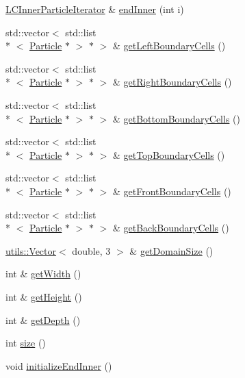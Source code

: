 \begin{DoxyCompactItemize}
\item 
\hyperlink{classutils_1_1LCInnerParticleIterator}{L\-C\-Inner\-Particle\-Iterator} \& \hyperlink{classutils_1_1LCParticleContainer_a52b237920b3ba34ca9440dc65f7f0b8e}{end\-Inner} (int i)
\item 
std\-::vector$<$ std\-::list\\*
$<$ \hyperlink{classParticle}{Particle} $\ast$ $>$ $\ast$ $>$ \& \hyperlink{classutils_1_1LCParticleContainer_aaccfac2aa0fe6a72bd323f28b9cf6c8e}{get\-Left\-Boundary\-Cells} ()
\item 
std\-::vector$<$ std\-::list\\*
$<$ \hyperlink{classParticle}{Particle} $\ast$ $>$ $\ast$ $>$ \& \hyperlink{classutils_1_1LCParticleContainer_af43e89aff6045632b40382cc43fe8707}{get\-Right\-Boundary\-Cells} ()
\item 
std\-::vector$<$ std\-::list\\*
$<$ \hyperlink{classParticle}{Particle} $\ast$ $>$ $\ast$ $>$ \& \hyperlink{classutils_1_1LCParticleContainer_a6168dbdbcb34d8a1d5c8076ab689dc68}{get\-Bottom\-Boundary\-Cells} ()
\item 
std\-::vector$<$ std\-::list\\*
$<$ \hyperlink{classParticle}{Particle} $\ast$ $>$ $\ast$ $>$ \& \hyperlink{classutils_1_1LCParticleContainer_acd0f8fa70852ca80b880cf8b2dac8a0a}{get\-Top\-Boundary\-Cells} ()
\item 
std\-::vector$<$ std\-::list\\*
$<$ \hyperlink{classParticle}{Particle} $\ast$ $>$ $\ast$ $>$ \& \hyperlink{classutils_1_1LCParticleContainer_aa214fd4e05dc3aada8325a8c799bf56d}{get\-Front\-Boundary\-Cells} ()
\item 
std\-::vector$<$ std\-::list\\*
$<$ \hyperlink{classParticle}{Particle} $\ast$ $>$ $\ast$ $>$ \& \hyperlink{classutils_1_1LCParticleContainer_a737313d452e0e326099723773d03c3a9}{get\-Back\-Boundary\-Cells} ()
\item 
\hyperlink{classutils_1_1Vector}{utils\-::\-Vector}$<$ double, 3 $>$ \& \hyperlink{classutils_1_1LCParticleContainer_a3a440e308844c2b2b5b7f7d04c9062a5}{get\-Domain\-Size} ()
\item 
int \& \hyperlink{classutils_1_1LCParticleContainer_a28a86a23c70dbd794bcc19359177b2ed}{get\-Width} ()
\item 
int \& \hyperlink{classutils_1_1LCParticleContainer_afce22370e53fd52c7b8da464c0db8860}{get\-Height} ()
\item 
int \& \hyperlink{classutils_1_1LCParticleContainer_a3555fee1f288caced21710ad170b0ffa}{get\-Depth} ()
\item 
int \hyperlink{classutils_1_1LCParticleContainer_a92d4c5b7c34d6f0d1cd18013799905b7}{size} ()
\item 
void \hyperlink{classutils_1_1LCParticleContainer_ae83b3c01db08dd91958f0b4ffa37d5a2}{initialize\-End\-Inner} ()
\end{DoxyCompactItemize}
